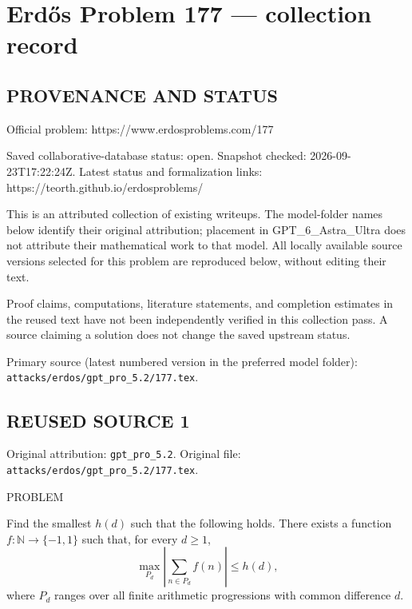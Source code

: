 \section*{Erd\H{o}s Problem 177 --- collection record}

\subsection*{PROVENANCE AND STATUS}
Official problem: https://www.erdosproblems.com/177

Saved collaborative-database status: open.
Snapshot checked: 2026-09-23T17:22:24Z.
Latest status and formalization links: https://teorth.github.io/erdosproblems/

This is an attributed collection of existing writeups. The model-folder names below identify their original attribution; placement in GPT\_6\_Astra\_Ultra does not attribute their mathematical work to that model. All locally available source versions selected for this problem are reproduced below, without editing their text.

Proof claims, computations, literature statements, and completion estimates in the reused text have not been independently verified in this collection pass. A source claiming a solution does not change the saved upstream status.

Primary source (latest numbered version in the preferred model folder): \texttt{attacks/erdos/gpt\_pro\_5.2/177.tex}.

\subsection*{REUSED SOURCE 1}
Original attribution: \texttt{gpt\_pro\_5.2}.
Original file: \texttt{attacks/erdos/gpt\_pro\_5.2/177.tex}.


PROBLEM

Find the smallest $h(d)$ such that the following holds. There exists a function $f:\mathbb{N}\to\{-1,1\}$ such that, for every $d\geq 1$,
\[\max_{P_d}\left\lvert \sum_{n\in P_d}f(n)\right\rvert\leq h(d),\]
where $P_d$ ranges over all finite arithmetic progressions with common difference $d$.

